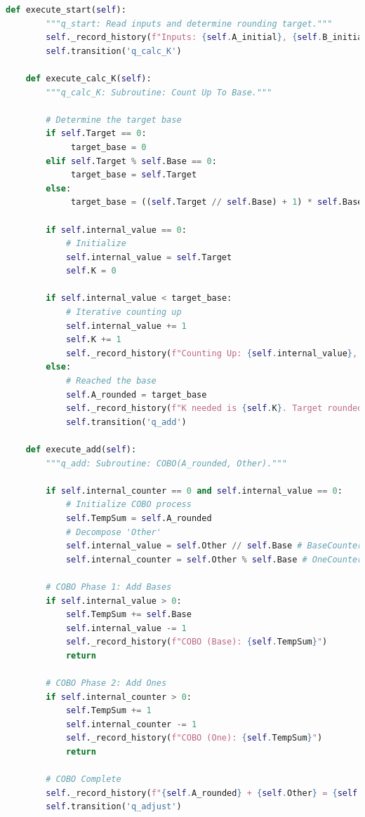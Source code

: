 \documentclass[11pt]{article}
\begin{document}
\begin{lstlisting}[language=Python]
    def execute_start(self):
        """q_start: Read inputs and determine rounding target."""
        self._record_history(f"Inputs: {self.A_initial}, {self.B_initial}. Target for rounding: {self.Target}", highlight=True)
        self.transition('q_calc_K')

    def execute_calc_K(self):
        """q_calc_K: Subroutine: Count Up To Base."""

        # Determine the target base
        if self.Target == 0:
             target_base = 0
        elif self.Target % self.Base == 0:
             target_base = self.Target
        else:
             target_base = ((self.Target // self.Base) + 1) * self.Base

        if self.internal_value == 0:
            # Initialize
            self.internal_value = self.Target
            self.K = 0

        if self.internal_value < target_base:
            # Iterative counting up
            self.internal_value += 1
            self.K += 1
            self._record_history(f"Counting Up: {self.internal_value}, K={self.K}")
        else:
            # Reached the base
            self.A_rounded = target_base
            self._record_history(f"K needed is {self.K}. Target rounded to {self.A_rounded}.", highlight=True)
            self.transition('q_add')

    def execute_add(self):
        """q_add: Subroutine: COBO(A_rounded, Other)."""

        if self.internal_counter == 0 and self.internal_value == 0:
            # Initialize COBO process
            self.TempSum = self.A_rounded
            # Decompose 'Other'
            self.internal_value = self.Other // self.Base # BaseCounter
            self.internal_counter = self.Other % self.Base # OneCounter

        # COBO Phase 1: Add Bases
        if self.internal_value > 0:
            self.TempSum += self.Base
            self.internal_value -= 1
            self._record_history(f"COBO (Base): {self.TempSum}")
            return

        # COBO Phase 2: Add Ones
        if self.internal_counter > 0:
            self.TempSum += 1
            self.internal_counter -= 1
            self._record_history(f"COBO (One): {self.TempSum}")
            return

        # COBO Complete
        self._record_history(f"{self.A_rounded} + {self.Other} = {self.TempSum}.", highlight=True)
        self.transition('q_adjust')


\end{lstlisting}
\end{document}
